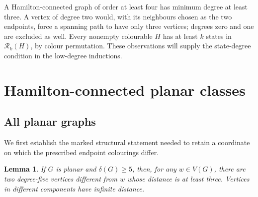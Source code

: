 \documentclass[11pt]{article}
\newtheorem{lemma}[theorem]{Lemma}
\theoremstyle{remark}
\newcommand{\Rk}{\mathcal R_k}
\numberwithin{equation}{section}
\numberwithin{table}{section}
\begin{document}
A Hamilton-connected graph of order at least four has minimum degree at
least three.  A vertex of degree two would, with its neighbours chosen
as the two endpoints, force a spanning path to have only three vertices;
degrees zero and one are excluded as well.  Every nonempty colourable
$H$ has at least $k$ states in $\Rk(H)$, by colour permutation.
These observations will supply the state-degree condition in the
low-degree inductions.

\section{Hamilton-connected planar classes}
\label{sec:hc-planar}

\subsection{All planar graphs}

We first establish the marked structural statement needed to retain a
coordinate on which the prescribed endpoint colourings differ.

\begin{lemma}
\label{lem:marked-five}
If $G$ is planar and $\delta(G)\ge5$, then, for any $w\in V(G)$,
there are two degree-five vertices different from $w$ whose distance is
at least three.  Vertices in different components have infinite distance.
\end{lemma}
\end{document}

